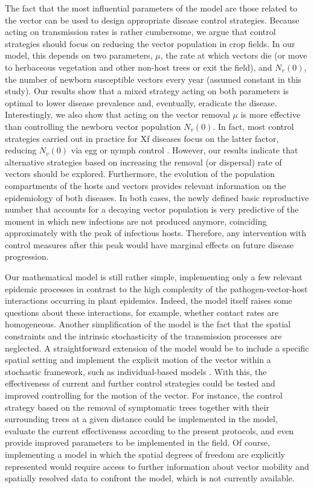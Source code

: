 The fact that the most influential parameters of the model are those
related to the vector can be used to design appropriate disease control
strategies. Because acting on transmission rates is rather cumbersome, we argue
that control strategies should focus on reducing the vector population in crop
fields. In our model, this depends on two parameters, $\mu$, the rate at which
vectors die (or move to herbaceous vegetation and other non-host trees or exit
the field), and $N_v(0)$, the number of newborn susceptible vectors every year
(assumed constant in this study). Our results show that a mixed strategy acting
on both parameters is optimal to lower disease prevalence and, eventually,
eradicate the disease. Interestingly, we also show that acting on the vector
removal $\mu$ is more effective than controlling the newborn vector population
$N_v(0)$. In fact, most control strategies carried out in practice for Xf
diseases focus on the latter factor, reducing $N_v(0)$ via egg or nymph control
\cite{Cornara2018, lopez2022mechanical, Lago2023}. However, our results
indicate that alternative strategies based on increasing the removal (or
dispersal) rate of vectors should be explored. Furthermore, the evolution of
the population compartments of the hosts and vectors provides relevant
information on the epidemiology of both diseases. In both cases, the newly
defined basic reproductive number that accounts for a decaying vector
population is very predictive of the moment in which new infections are not
produced anymore, coinciding approximately with the peak of infectious hosts.
Therefore, any intervention with control measures after this peak would have
marginal effects on future disease progression.

Our mathematical model is still rather simple, implementing only a few
relevant epidemic processes in contrast to the high complexity of the
pathogen-vector-host interactions occurring in plant epidemics. Indeed, the
model itself raises some questions about these interactions, for example,
whether contact rates are homogeneous. Another simplification of the
model is the fact that the spatial constraints and the intrinsic stochasticity
of the transmission processes are neglected. A straightforward extension of the
model would be to include a specific spatial setting and implement the explicit
motion of the vector within a stochastic framework, such as individual-based
models \cite{Grimm2005}. With this, the effectiveness of current and further
control strategies could be tested and improved controlling for the motion of
the vector. For instance, the control strategy based on the removal of
symptomatic trees together with their surrounding trees at a given distance
could be implemented in the model, evaluate the current effectiveness according
to the present protocols, and even provide improved parameters to be
implemented in the field. Of course, implementing a model in which the spatial
degrees of freedom are explicitly represented would require access to further
information about vector mobility and spatially resolved data to confront the
model, which is not currently available.

